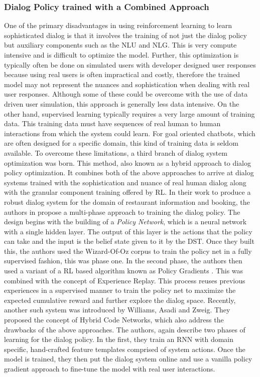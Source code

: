 \documentclass[12pt]{extarticle}
\numberwithin{equation}{section}
\begin{document}
	\subsubsection{Dialog Policy trained with a Combined Approach}
	One of the primary disadvantages in using reinforcement learning to learn sophisticated dialog is that it involves the training of not just the dialog policy but auxiliary components such as the NLU and NLG. This is very compute intensive and is difficult to optimize the model. Further, this optimization is typically often be done on simulated users with developer designed user responses because using real users is often impractical and costly, therefore the trained model may not represent the nuances and sophistication when dealing with real user responses.
	Although some of these could be overcome with the use of data driven user simulation, this approach is generally less data intensive.
	On the other hand, supervised learning typically requires a very large amount of training data. This training data must have sequences of real human to human interactions from which the system could learn. For goal oriented chatbots, which are often designed for a specific domain, this kind of training data is seldom available. To overcome these limitations, a third branch of dialog system optimization was born. This method, also known as a hybrid approach to dialog policy optimization. It combines both of the above approaches to arrive at dialog systems trained with the sophistication and nuance of real human dialog along with the granular component training offered by RL. In their work to produce a robust dialog system for the domain of restaurant information and booking, the authors in \cite{Su_continous_dm} propose a multi-phase approach to training the dialog policy. The design begins with the building of a \textit{Policy Network}, which is a neural network with a single hidden layer. The output of this layer is the actions that the policy can take and the input is the belief state given to it by the DST. Once they built this, the authors used the Wizard-Of-Oz corpus to train the policy net in a fully supervised fashion, this was phase one. In the second phase, the authors then used a variant\cite{Schulman_trpo} of a RL based algorithm known as Policy Gradients \cite{Sutton_pg}. This was combined with the concept of Experience Replay\cite{Lin1992}. This process reuses previous experiences in a supervised manner to train the policy net to maximize the expected cumulative reward and further explore the dialog space. Recently, another such system was introduced by Williams, Asadi and Zweig. They proposed the concept of Hybrid Code Networks\cite{Williams_HCN_e2e}, which also address the drawbacks of the above approaches. The authors, again describe two phases of learning for the dialog policy. In the first, they train an RNN with domain specific, hand-crafted feature templates comprised of system actions. Once the model is trained, they then put the dialog system online and use a vanilla policy gradient\cite{Sutton_pg} approach to fine-tune the model with real user interactions. 
	\pagebreak
\end{document}
